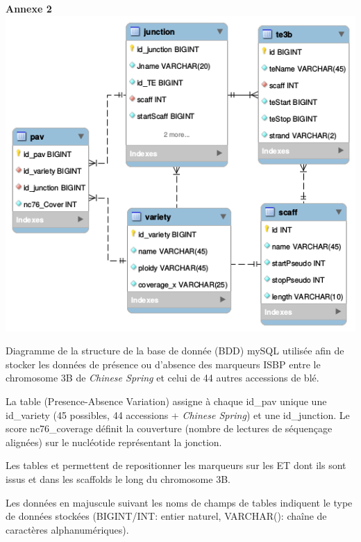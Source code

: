 \documentclass[a4paper, 12pt]{article}
\begin{document}
\begin{onehalfspace}
\newpage
\begin{center}
\Large\textbf{Annexe 2}\\
\vspace{1cm}
\includegraphics[scale=0.75]{pic_Data/ane3.png}\\
\end{center}

Diagramme de la structure de la base de donnée (BDD) mySQL utilisée afin de stocker les données de présence ou d'absence des marqueurs ISBP entre le chromosome 3B de \textit{Chinese Spring} et celui de 44 autres accessions de blé.

La table  (Presence-Absence Variation) assigne à chaque id\_pav unique une id\_variety (45 possibles, 44 accessions + \textit{Chinese Spring}) et une id\_junction. Le score nc76\_coverage définit la couverture (nombre de lectures de séquençage alignées) sur le nucléotide  représentant la jonction.

Les tables  et  permettent de repositionner les marqueurs sur les ET dont ils sont issus et dans les scaffolds le long du chromosome 3B.

Les données en majuscule suivant les noms de champs de tables indiquent le type de données stockées (BIGINT/INT: entier naturel, VARCHAR(): chaîne de caractères alphanumériques).\\


\end{onehalfspace}
\end{document}
